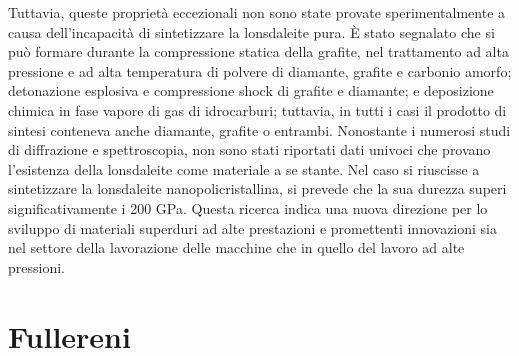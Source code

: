 \documentclass[a4paper,titlepage]{book}
\begin{document}
Tuttavia, queste proprietà eccezionali non sono state provate sperimentalmente a causa dell'incapacità di sintetizzare la lonsdaleite pura. È stato segnalato che si può formare durante la compressione statica della grafite, nel trattamento ad alta pressione e ad alta temperatura di polvere di diamante, grafite e carbonio amorfo; detonazione esplosiva e compressione shock di grafite e diamante; e deposizione chimica in fase vapore di gas di idrocarburi; tuttavia, in tutti i casi il prodotto di sintesi conteneva anche diamante, grafite o entrambi.
Nonostante i numerosi studi di diffrazione e spettroscopia, non sono stati riportati dati univoci che provano l'esistenza della lonsdaleite come materiale a se stante. 
Nel caso si riuscisse a sintetizzare la lonsdaleite nanopolicristallina, si prevede che la sua durezza superi significativamente i 200 GPa. Questa ricerca indica una nuova direzione per lo sviluppo di materiali superduri ad alte prestazioni e promettenti innovazioni sia nel settore della lavorazione delle macchine che in quello del lavoro ad alte pressioni.

\chapter{Fullereni}
\end{document}

